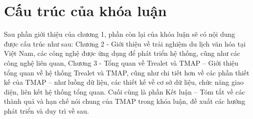 \section{Cấu trúc của khóa luận}
Sau phần giới thiệu của chương 1, phần còn lại của khóa luận sẽ có nội dung
được cấu trúc như sau:
Chương 2 - Giới thiệu về trải nghiệm du lịch văn hóa tại Việt Nam, các công
nghệ được ứng dụng để phát triển hệ thống, cũng như các công nghệ liên quan,
Chương 3 - Tổng quan về Trealet và TMAP – Giới thiệu tổng quan về hệ thống
Trealet và TMAP, cũng như chi tiết hơn về các phần thiết kế của TMAP – như luồng
dữ liệu, các thiết kế về cơ sở dữ liệu, chức năng giao diện, liên kết hệ thống tổng
quan.
Cuối cùng là phần Kết luận – Tóm tắt về các thành quả và hạn chế nói chung
của TMAP trong khóa luận, đề xuất các hướng phát triển và duy trì về sau.